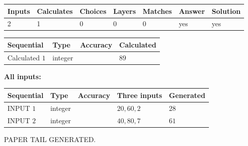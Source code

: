\documentclass[12pt]{article}
\begin{document}
 
\noindent{}
 
 

 
   
   
   
   
\noindent\begin{tabular}{|l|l|l|l|l|l|l|}
 \hline
Inputs & Calculates & Choices & Layers & Matches & Answer & Solution \\ \hline
 2  & 
 1  & 
 0
  & 
 0  & 
 0  & 
  yes & 
  yes 
  \\ \hline
 \end{tabular}
   
   
   
   
\noindent{}
   
   
  
  
\noindent\begin{tabular}{|l|l|l|l|}
\hline
 Sequential & Type & Accuracy & Calculated \\ 
\hline
 
 
  Calculated $  1 $ & integer &  & 
  $ 89 $ 
 \\  \hline  
 \end{tabular}
   
   
   
   
\noindent\vspace{0.1in}\hspace{-0.08in} {\textbf{\Large{All inputs: }}}
   
   
  
  
\noindent\begin{tabular}{|l|l|l|l|l|}
\hline
 Sequential & Type & Accuracy & Three inputs & Generated \\ 
\hline
 
 
  INPUT $  1 $ & integer &  & $
 20
 , 
 60
 , 
 2
 $ & $ 28 $ 
 \\  \hline  
 
 
  INPUT $  2 $ & integer &  & $
 40
 , 
 80
 , 
 7
 $ & $ 61 $ 
 \\  \hline  
 \end{tabular}
   
   
   
   
   
   
 \vspace{0.2in}
 
   
   
\vspace{2.0in} PAPER TAIL GENERATED.
   
\end{document}

